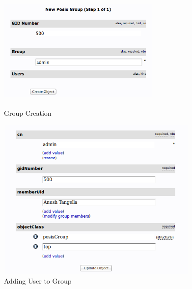 \documentclass[12pt]{report}
\begin{document}
		\begin{figure}[H]
		\begin{center}
		\includegraphics[width=8cm,height=6cm]{Screens/admin_group.png}
		\caption{Group Creation \label{fig: Group Creation}}
		\end{center}
		\end{figure}		
		
		\begin{figure}[H]
		\begin{center}
		\includegraphics[width=10cm,height=8cm]{Screens/AddUsertoGroup.png}
		\caption{Adding User to Group \label{fig: Adding User to Group}}
		\end{center}
		\end{figure}
		
\end{document}

